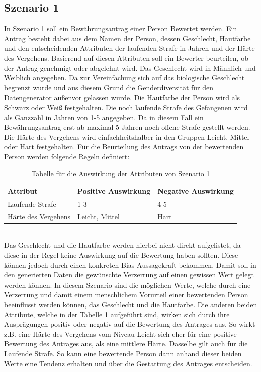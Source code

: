 \begin{onehalfspace}
\subsection{Szenario 1}
\label{subsubsec:szenario1}
In Szenario 1 soll ein Bewährungsantrag einer Person Bewertet werden. Ein Antrag besteht dabei aus dem Namen der Person, dessen Geschlecht, Hautfarbe und den entscheidenden Attributen der laufenden Strafe in Jahren und der Härte des Vergehens. Basierend auf diesen Attributen soll ein Bewerter beurteilen, ob der Antrag genehmigt oder abgelehnt wird. Das Geschlecht wird in \glqq{}Männlich\grqq{} und \glqq{}Weiblich\grqq{} angegeben. Da zur Vereinfachung sich auf das biologische Geschlecht begrenzt wurde und aus diesem Grund die Genderdiversität für den Datengenerator au{\ss}envor gelassen wurde. Die Hautfarbe der Person wird als \glqq{}Schwarz\grqq{} oder \glqq{}Weiß\grqq{} festgehalten. Die noch laufende Strafe des Gefangenen wird als Ganzzahl in Jahren von 1-5 angegeben. Da in diesem Fall ein Bewährungsantrag erst ab maximal 5 Jahren noch offene Strafe gestellt werden. Die Härte des Vergehens wird einfachheitshalber in den Gruppen \glqq{}Leicht\grqq{}, \glqq{}Mittel\grqq{} oder \glqq{}Hart\grqq{} festgehalten. \newline
Für die Beurteilung des Antrags von der bewertenden Person werden folgende Regeln definiert:
\begin{table}[!h]
    \centering
    \begin{tabular}{|l|l|l|}
    \hline
    \textbf{Attribut}   & \textbf{Positive Auswirkung} & \textbf{Negative Auswirkung} \\ \hline
    Laufende Strafe     & 1-3                          & 4-5                          \\ \hline
    Härte des Vergehens & Leicht, Mittel               & Hart                         \\ \hline
    \end{tabular}
\caption{Tabelle für die Auswirkung der Attributen von Szenario 1}
\label{table:1}
\end{table}\\
Das Geschlecht und die Hautfarbe werden hierbei nicht direkt aufgelistet, da diese in der Regel keine Auswirkung auf die Bewertung haben sollten. Diese können jedoch durch einen konkreten Bias Aussagekraft bekommen. Damit soll in den generierten Daten die gewünschte Verzerrung auf einen gewissen Wert gelegt werden können. In diesem Szenario sind die möglichen Werte, welche durch eine Verzerrung und damit einem menschlichem Vorurteil einer bewertenden Person beeinflusst werden können, das Geschlecht und die Hautfarbe. Die anderen beiden Attribute, welche in der Tabelle \ref*{table:1} aufgeführt sind, wirken sich durch ihre Ausprägungen positiv oder negativ auf die Bewertung des Antrages aus. So wirkt z.B. eine Härte des Vergehens vom Niveau Leicht sich eher für eine positive Bewertung des Antrages aus, als eine mittlere Härte. Dasselbe gilt auch für die Laufende Strafe. So kann eine bewertende Person dann anhand dieser beiden Werte eine Tendenz erhalten und über die Gestattung des Antrages entscheiden.

\end{onehalfspace}
